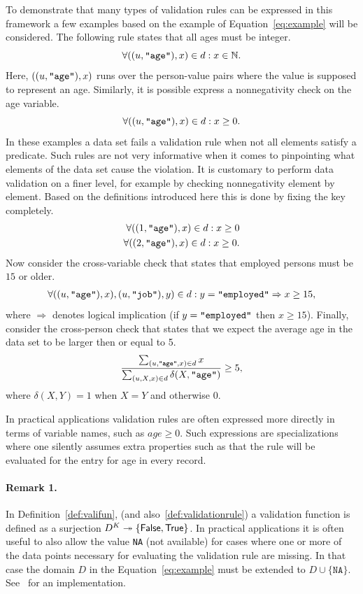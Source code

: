 To demonstrate that many types of validation rules can be expressed in this
framework a few examples based on the example of Equation~\eqref{eq:example}
will be considered. The following rule states that all ages must be integer.
$$
\forall ((u,\texttt{"age"}),x)\in d: x \in \mathbb{N}.
$$
Here, $((u,\texttt{"age"}),x)$ runs over the person-value pairs where the value is
supposed to represent an age. Similarly, it is possible express a nonnegativity
check on the age variable.
$$
\forall ((u,\texttt{"age"}),x)\in d: x \geq 0.
$$
In these examples a data set fails a validation rule when not all elements
satisfy a predicate. Such rules are not very informative when it comes to
pinpointing what elements of the data set cause the violation. It is customary
to perform data validation on a finer level, for example by checking 
nonnegativity element by element. Based on the definitions introduced here
this is done by fixing the key completely.
\begin{align*}
\forall ((1,\texttt{"age"}),x)\in d: x\geq 0\\
\forall ((2,\texttt{"age"}),x)\in d: x\geq 0.
\end{align*}
Now consider the cross-variable check that states that employed persons must be
$15$ or older.
\begin{align*}
\forall ((u,\texttt{"age"}),x), (u,\texttt{"job"}),y)\in d: y=\texttt{"employed"}\Rightarrow x\geq 15,
\end{align*}
where $\Rightarrow$ denotes logical implication (if $y=\texttt{"employed"}$ then
$x\geq 15$).  Finally, consider the cross-person check that states that we
expect the average age in the data set to be larger then or equal to 5.
$$
\frac{
\sum_{(u,\texttt{"age"},x)\in d} x}{
\sum_{(u,X,x)\in d} \delta(X,\texttt{"age"})
} \geq 5,
$$
where $\delta(X,Y)=1$ when $X=Y$ and otherwise 0. 

In practical applications validation rules are often expressed more directly in
terms of variable names, such as $age \geq 0$. Such expressions are
specializations where one silently assumes extra properties such as that the
rule will be evaluated for the entry for age in every record. 

\paragraph{Remark 1.} In Definition~\ref{def:valifun}, (and
also~\ref{def:validationrule}) a validation function is defined as a surjection
$D^K\twoheadrightarrow\{\textsf{False}{},\textsf{True}{}\}$. In practical applications it is often
useful to also allow the value \texttt{NA} (not available) for cases where one
or more of the data points necessary for evaluating the validation rule are
missing. In that case the domain $D$ in the Equation~\eqref{eq:example} must be
extended to $D\cup \{\texttt{NA}\}$. See~\citet{loo2019infrastructure} for an
implementation.

